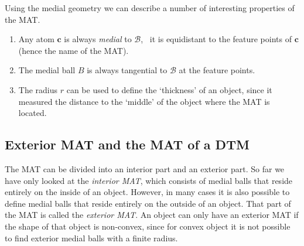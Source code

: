 Using the medial geometry we can describe a number of interesting properties of the MAT.
\begin{enumerate}
	\item Any atom $\mathbf{c}$ is always \emph{medial} to $\mathcal{B}$, \ie\ it is equidistant to the feature points of $\mathbf{c}$ (hence the name of the MAT).
	\item The medial ball $B$ is always tangential to $\mathcal{B}$ at the feature points. 
	\item The radius $r$ can be used to define the `thickness' of an object, since it measured the distance to the `middle' of the object where the MAT is located.
\end{enumerate}

\subsection{Exterior MAT and the MAT of a DTM}
The MAT can be divided into an interior part and an exterior part.
So far we have only looked at the \emph{interior MAT}, which consists of medial balls that reside entirely on the inside of an object.
However, in many cases it is also possible to define medial balls that reside entirely on the outside of an object.
That part of the MAT is called the \emph{exterior MAT}.
An object can only have an exterior MAT if the shape of that object is non-convex, since for convex object it is not possible to find exterior medial balls with a finite radius.

